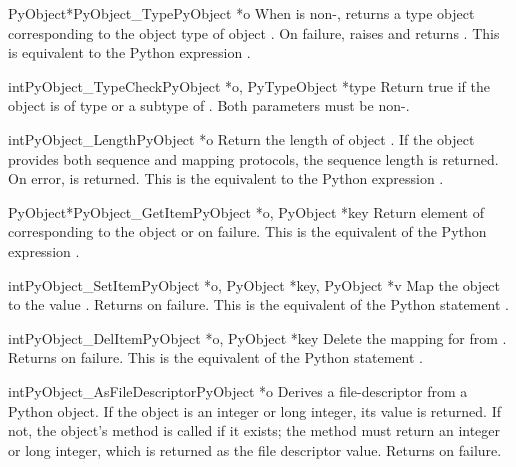 \begin{cfuncdesc}{PyObject*}{PyObject_Type}{PyObject *o}
  When  is non-\NULL, returns a type object corresponding to
  the object type of object . On failure, raises
   and returns \NULL.  This is equivalent to
  the Python expression .
\end{cfuncdesc}

\begin{cfuncdesc}{int}{PyObject_TypeCheck}{PyObject *o, PyTypeObject *type}
  Return true if the object  is of type  or a subtype
  of .  Both parameters must be non-\NULL.
\end{cfuncdesc}

\begin{cfuncdesc}{int}{PyObject_Length}{PyObject *o}
  Return the length of object .  If the object  provides
  both sequence and mapping protocols, the sequence length is
  returned.  On error,  is returned.  This is the equivalent
  to the Python expression .
\end{cfuncdesc}


\begin{cfuncdesc}{PyObject*}{PyObject_GetItem}{PyObject *o, PyObject *key}
  Return element of  corresponding to the object  or
  \NULL{} on failure.  This is the equivalent of the Python expression
  .
\end{cfuncdesc}


\begin{cfuncdesc}{int}{PyObject_SetItem}{PyObject *o,
                                         PyObject *key, PyObject *v}
  Map the object  to the value .  Returns  on
  failure.  This is the equivalent of the Python statement
  .
\end{cfuncdesc}


\begin{cfuncdesc}{int}{PyObject_DelItem}{PyObject *o, PyObject *key}
  Delete the mapping for  from .  Returns  on
  failure. This is the equivalent of the Python statement .
\end{cfuncdesc}

\begin{cfuncdesc}{int}{PyObject_AsFileDescriptor}{PyObject *o}
  Derives a file-descriptor from a Python object.  If the object is an
  integer or long integer, its value is returned.  If not, the
  object's  method is called if it exists; the method
  must return an integer or long integer, which is returned as the
  file descriptor value.  Returns  on failure.
\end{cfuncdesc}

